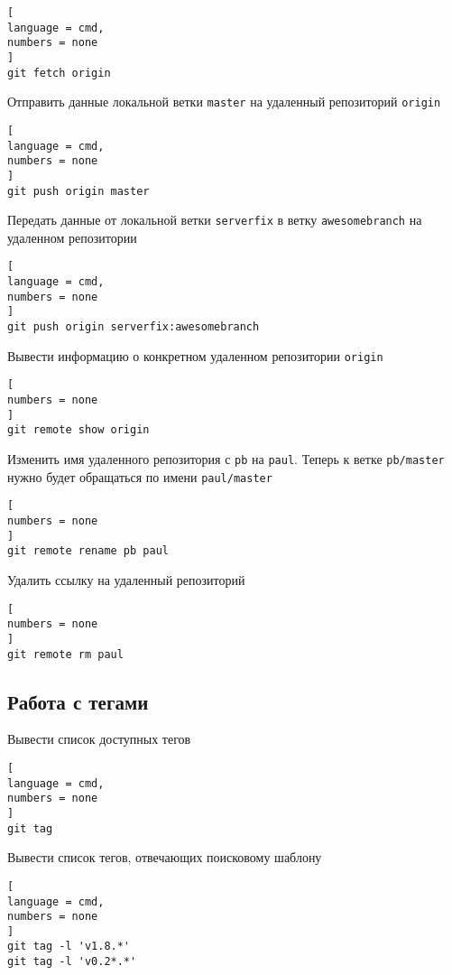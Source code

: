 \documentclass[%
	11pt,
	a4paper,
	utf8,
		]{article}
\begin{document}
\begin{lstlisting}[
language = cmd,
numbers = none
]
git fetch origin
\end{lstlisting}


Отправить данные локальной ветки \texttt{master} на удаленный репозиторий \texttt{origin}

\begin{lstlisting}[
language = cmd,
numbers = none
]
git push origin master
\end{lstlisting}


Передать данные от локальной ветки \texttt{serverfix} в ветку \texttt{awesomebranch} на удаленном репозитории

\begin{lstlisting}[
language = cmd,
numbers = none
]
git push origin serverfix:awesomebranch
\end{lstlisting}

Вывести информацию о конкретном удаленном репозитории \texttt{origin}

\begin{lstlisting}[
numbers = none
]
git remote show origin
\end{lstlisting}


Изменить имя удаленного репозитория с \texttt{pb} на \texttt{paul}. Теперь к ветке \texttt{pb/master} нужно будет обращаться по имени \texttt{paul/master}

\begin{lstlisting}[
numbers = none
]
git remote rename pb paul
\end{lstlisting}


Удалить ссылку на удаленный репозиторий

\begin{lstlisting}[
numbers = none
]
git remote rm paul
\end{lstlisting}


\subsection{Работа с тегами}

Вывести список доступных тегов

\begin{lstlisting}[
language = cmd,
numbers = none
]
git tag
\end{lstlisting}


Вывести список тегов, отвечающих поисковому  шаблону

\begin{lstlisting}[
language = cmd,
numbers = none
]
git tag -l 'v1.8.*'
git tag -l 'v0.2*.*'
\end{lstlisting}
\end{document}
